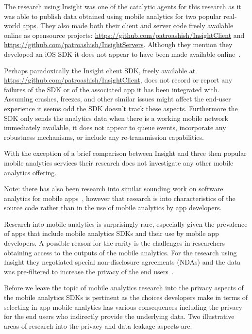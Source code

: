 The research using Insight was one of the catalytic agents for this research as it was able to publish data obtained using mobile analytics for two popular real-world apps. They also made both their client and server code freely available online as opensource projects: \url{https://github.com/patroashish/InsightClient} and \url{https://github.com/patroashish/InsightServers}. Although they mention they developed an iOS SDK it does not appear to have been made available online~\citep[p. 85]{patro2015_building_blocks_to_understand_wireless_experience}.

Perhaps paradoxically the Insight client SDK, freely available at \url{https://github.com/patroashish/InsightClient}, does not record or report any failures of the SDK or of the associated app it has been integrated with. Assuming crashes, freezes, and other similar issues might affect the end-user experience it seems odd the SDK doesn't track these aspects. Furthermore the SDK only sends the analytics data when there is a working mobile network immediately available, it does not appear to queue events, incorporate any robustness mechanisms, or include any re-transmission capabilities.

With the exception of a brief comparison between Insight and three then popular mobile analytics services their research does not investigate any other mobile analytics offering.

Note: there has also been research into similar sounding work on software analytics for mobile apps~\citet{minelli2013_software_analytics_samoa}, however that research is into characteristics of the source code rather than in the use of mobile analytics by app developers.

Research into mobile analytics is surprisingly rare, especially given the prevalence of apps that include mobile analytics SDKs and their use by mobile app developers. A possible reason for the rarity is the challenges in researchers obtaining access to the outputs of the mobile analytics. For the research using Insight they negotiated special non-disclosure agreements (NDAs) and the data was pre-filtered to increase the privacy of the end users~\citep[p. 91]{patro2015_building_blocks_to_understand_wireless_experience}. 

Before we leave the topic of mobile analytics research into the privacy aspects of the mobile analytics SDKs is pertinent as the choices developers make in terms of selecting in-app mobile analytics has various consequences including the privacy for the end users who indirectly provide the underlying data. Two illustrative areas of research into the privacy and data leakage aspects are:

